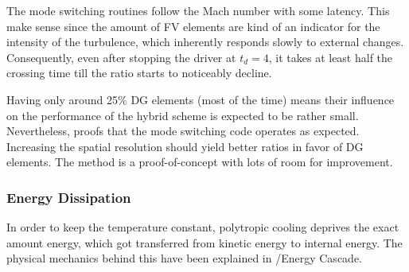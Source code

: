 The mode switching routines follow the Mach number with some latency. This make
sense since the amount of FV elements are kind of an indicator for the
intensity of the turbulence, which inherently responds slowly to external
changes. Consequently, even after stopping the driver at $t_d = 4$, it takes at
least half the crossing time till the ratio starts to noticeably decline.

Having only around 25\% DG elements (most of the time) means their influence on
the performance of the hybrid scheme is expected to be rather small.  Nevertheless,
 proofs that the mode switching
code operates as expected. Increasing the spatial resolution should yield
better ratios in favor of DG elements. The method is a proof-of-concept with
lots of room for improvement.


\newpage

\subsubsection{Energy Dissipation}
\label{sec:stirturb-energy-dissipation}
In order to keep the temperature constant, polytropic cooling deprives the exact
amount energy, which got transferred from kinetic energy to internal energy. The
physical mechanics behind this have been explained in /Energy
Cascade.

